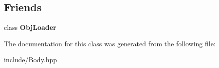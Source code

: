 \subsection*{Friends}
\begin{DoxyCompactItemize}
\item 
\hypertarget{class_body_a7edab2043086f1303d4a8f082cbe52ce}{class {\bfseries Obj\-Loader}}\label{class_body_a7edab2043086f1303d4a8f082cbe52ce}

\end{DoxyCompactItemize}


The documentation for this class was generated from the following file\-:\begin{DoxyCompactItemize}
\item 
include/Body.\-hpp\end{DoxyCompactItemize}
